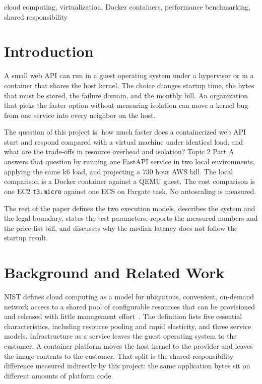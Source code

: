 \documentclass[conference,a4paper]{IEEEtran}
\begin{document}
\begin{IEEEkeywords}
	cloud computing, virtualization, Docker containers, performance benchmarking, shared responsibility
\end{IEEEkeywords}

\section{Introduction}
\label{sec:introduction}

A small web API can run in a guest operating system under a hypervisor or in a container that shares the host kernel. The choice changes startup time, the bytes that must be stored, the failure domain, and the monthly bill. An organization that picks the faster option without measuring isolation can move a kernel bug from one service into every neighbor on the host.

The question of this project is: how much faster does a containerized web API start and respond compared with a virtual machine under identical load, and what are the trade-offs in resource overhead and isolation? Topic 2 Part A answers that question by running one FastAPI service in two local environments, applying the same k6 load, and projecting a 730 hour AWS bill. The local comparison is a Docker container against a QEMU guest. The cost comparison is one EC2 \texttt{t3.micro} against one ECS on Fargate task. No autoscaling is measured.

The rest of the paper defines the two execution models, describes the system and the legal boundary, states the test parameters, reports the measured numbers and the price-list bill, and discusses why the median latency does not follow the startup result.

\section{Background and Related Work}
\label{sec:related_work}

NIST defines cloud computing as a model for ubiquitous, convenient, on-demand network access to a shared pool of configurable resources that can be provisioned and released with little management effort~\cite{b1}. The definition lists five essential characteristics, including resource pooling and rapid elasticity, and three service models. Infrastructure as a service leaves the guest operating system to the customer. A container platform moves the host kernel to the provider and leaves the image contents to the customer. That split is the shared-responsibility difference measured indirectly by this project: the same application bytes sit on different amounts of platform code.
\end{document}
